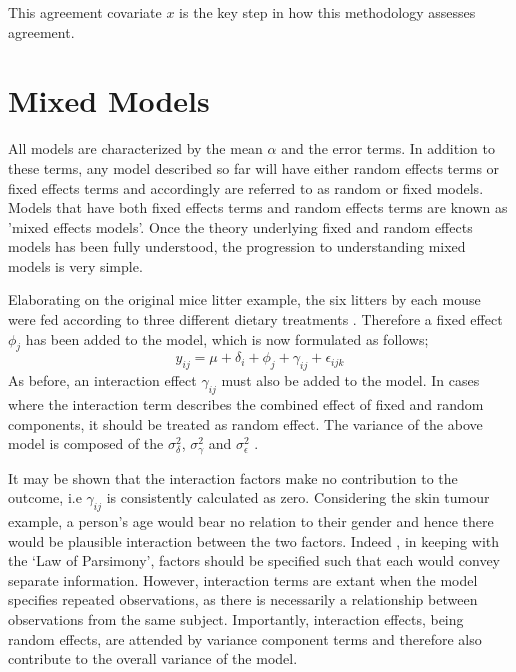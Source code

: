 \documentclass[12pt, a4paper]{report}
\theoremstyle{plain}
\theoremstyle{definition}
\theoremstyle{remark}
\begin{document}
This agreement covariate $x$ is the key step in how this
methodology assesses agreement.



\section{Mixed Models}


All models are characterized by the mean $\alpha$ and the error
terms. In addition to these terms, any model described so far will
have either random effects terms or fixed effects terms and
accordingly are referred to as random or fixed models. Models that
have both fixed effects terms and random effects terms are known
as 'mixed effects models'. Once the theory underlying fixed and
random effects models has been fully understood, the progression
to understanding mixed models is very simple.

Elaborating on the original mice litter example, the six litters
by each mouse were fed according to three different dietary
treatments \citep{Searle}. Therefore a fixed effect $\phi_{j}$ has
been added to the model, which is now formulated as follows;
\begin{equation}
y_{ij} = \mu + \delta_{i} + \phi_{j} + \gamma_{ij} +
\epsilon_{ijk}
\end{equation}
As before, an interaction effect $\gamma_{ij}$ must also be added
to the model. In cases where the interaction term describes the
combined effect of fixed and random components, it should be
treated as random effect. The variance of the above model is
composed of the $\sigma^{2}_{\delta}$, $\sigma^{2}_{\gamma}$ and
$\sigma^{2}_{\epsilon}$ .


It may be shown that the interaction factors make no contribution
to the outcome, i.e $\gamma_{ij}$ is consistently calculated as
zero. Considering the skin tumour example, a person's age would
bear no relation to their gender and hence there would be
plausible interaction between the two factors. Indeed , in keeping
with the `Law of Parsimony', factors should be specified such that
each would convey separate information. However, interaction terms
are extant when the model specifies repeated observations, as
there is necessarily a relationship between observations from the
same subject. Importantly, interaction effects, being random
effects, are attended by variance component terms and therefore
also contribute to the overall variance of the model.
\end{document}
